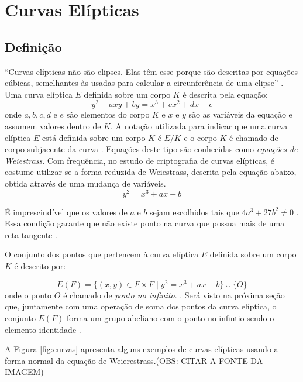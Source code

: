 %
%
\section{Curvas Elípticas}

\subsection{Definição}
``Curvas elípticas não são elipses. Elas têm esse porque são descritas por equações cúbicas, semelhantes às usadas para calcular a circunferência de uma elipse'' \cite{Stallings:2011}. Uma curva elíptica $E$ definida sobre um corpo $K$ é descrita pela equação:
\begin{equation}
y^2 + axy + by = x^3 + cx^2 + dx + e \label{eq:5}
\end{equation}
onde \(a, b, c, d\) e \(e\) são elementos do corpo $K$ e \(x\) e \(y\) são as variáveis da equação e assumem valores dentro de $K$. A notação utilizada para indicar que uma curva elíptica $E$ está definida sobre um corpo $K$ é $E/K$ e o corpo $K$ é chamado de corpo subjacente da curva \cite{Hankerson:2004}. Equações deste tipo são conhecidas como \textit{equações de Weiestrass}. Com frequência, no estudo de criptografia de curvas elípticas, é costume utilizar-se a forma reduzida de Weiestrass, descrita pela equação abaixo, obtida através de uma mudança de variáveis.
\begin{equation}
y^2 = x^3 + ax + b \label{eq:6}
\end{equation}

É imprescindível que os valores de $a$ e $b$ sejam escolhidos tais que $4a^3 + 27b^2 \ne 0$ \cite{Mandy:2007}. Essa condição garante que não existe ponto na curva que possua mais de uma reta tangente \cite{Hankerson:2004}.

O conjunto dos pontos que pertencem à curva elíptica $E$ definida sobre um corpo $K$ é descrito por:

$$ E(F) = \{(x,y) \in F \times F \mid y^2 = x^3 + ax + b\} \cup \{O\} $$
onde o ponto ${O}$ é chamado de \textit{ponto no infinito}. \cite{Mandy:2007}.
Será visto na próxima seção que, juntamente com uma operação de soma dos pontos da curva elíptica, o conjunto $E(F)$ forma um grupo abeliano com o ponto no infintio sendo o elemento identidade \cite{Hankerson:2004}.

A Figura \ref{fig:curvas} apresenta alguns exemplos de curvas elípticas usando a forma normal da equação de Weierestrass.(OBS: CITAR A FONTE DA IMAGEM)

